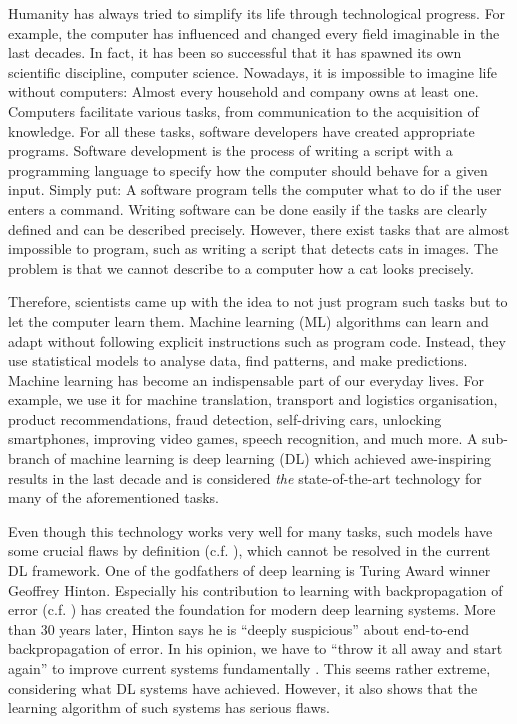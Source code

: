 Humanity has always tried to simplify its life through technological progress.
For example, the computer has influenced and changed every field imaginable in the last decades. 
In fact, it has been so successful that it has spawned its own scientific discipline, computer science.
Nowadays, it is impossible to imagine life without computers: Almost every household and company owns at least one.
Computers facilitate various tasks, from communication to the acquisition of knowledge.
For all these tasks, software developers have created appropriate programs.
Software development is the process of writing a script with a programming language to specify how the computer should behave for a given input.
Simply put: A software program tells the computer what to do if the user enters a command.
Writing software can be done easily if the tasks are clearly defined and can be described precisely.
However, there exist tasks that are almost impossible to program, such as writing a script that detects cats in images.
The problem is that we cannot describe to a computer how a cat looks precisely.

Therefore, scientists came up with the idea to not just program such tasks but to let the computer learn them.
Machine learning (ML) algorithms can learn and adapt without following explicit instructions such as program code.
Instead, they use statistical models to analyse data, find patterns, and make predictions.
Machine learning has become an indispensable part of our everyday lives.
For example, we use it for machine translation, transport and logistics organisation, product recommendations, fraud detection, self-driving cars, unlocking smartphones, improving video games, speech recognition, and much more.
A sub-branch of machine learning is deep learning (DL) which achieved awe-inspiring results in the last decade and is considered \emph{the} state-of-the-art technology for many of the aforementioned tasks.

Even though this technology works very well for many tasks, such models have some crucial flaws by definition (c.f. ), which cannot be resolved in the current DL framework.
One of the godfathers of deep learning is Turing Award winner Geoffrey Hinton. 
Especially his contribution to learning with backpropagation of error (c.f. ) has created the foundation for modern deep learning systems.
More than 30 years later, Hinton says he is ``deeply suspicious'' about end-to-end backpropagation of error. In his opinion, we have to ``throw it all away and start again'' to improve current systems fundamentally .
This seems rather extreme, considering what DL systems have achieved.
However, it also shows that the learning algorithm of such systems has serious flaws.

